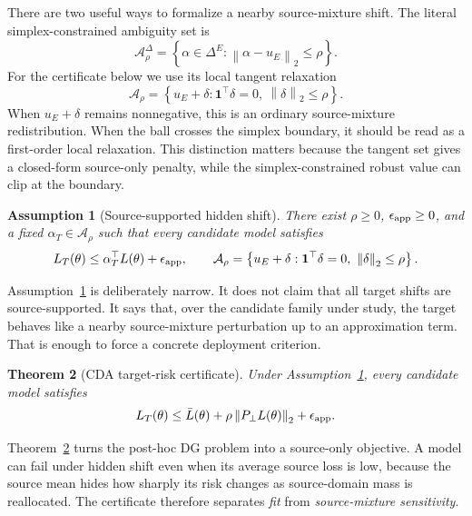 \documentclass{article}
\newtheorem{theorem}{Theorem}[section]
\newtheorem{assumption}[theorem]{Assumption}
\theoremstyle{definition}
\newcommand{\cA}{\mathcal{A}}
\newcommand{\simplex}{\Delta}
\newcommand{\one}{\mathbf{1}}
\newcommand{\norm}[1]{\left\lVert #1 \right\rVert}
\newcommand{\braces}[1]{\left\{ #1 \right\}}
\newcommand{\ub}{u_E}
\begin{document}
There are two useful ways to formalize a nearby source-mixture shift. The literal simplex-constrained ambiguity set is
\[
\cA_\rho^\Delta
=
\braces{\alpha\in\simplex^E:\norm{\alpha-\ub}_2\le\rho}.
\]
For the certificate below we use its local tangent relaxation
\[
\cA_\rho
=
\braces{\ub+\delta:\one^\top\delta=0,\ \norm{\delta}_2\le\rho}.
\]
When \(\ub+\delta\) remains nonnegative, this is an ordinary source-mixture redistribution. When the ball crosses the simplex boundary, it should be read as a first-order local relaxation. This distinction matters because the tangent set gives a closed-form source-only penalty, while the simplex-constrained robust value can clip at the boundary.

\begin{assumption}[Source-supported hidden shift]
\label{ass:hidden_shift}
There exist \(\rho \ge 0\), \(\epsilon_{\rm app} \ge 0\), and a fixed \(\alpha_T \in \cA_\rho\) such that every candidate model satisfies
\begin{equation}
L_T(\theta) \le \alpha_T^\top L(\theta) + \epsilon_{\rm app},
\qquad
\cA_\rho = \braces{\ub + \delta : \one^\top \delta = 0,\ \norm{\delta}_2 \le \rho }.
\label{eq:hidden_shift}
\end{equation}
\end{assumption}

Assumption~\ref{ass:hidden_shift} is deliberately narrow. It does not claim that all target shifts are source-supported. It says that, over the candidate family under study, the target behaves like a nearby source-mixture perturbation up to an approximation term. That is enough to force a concrete deployment criterion.

\begin{theorem}[CDA target-risk certificate]
\label{thm:cda_certificate}
Under Assumption~\ref{ass:hidden_shift}, every candidate model satisfies
\begin{equation}
L_T(\theta)
\le
\bar L(\theta) + \rho \norm{P_\perp L(\theta)}_2 + \epsilon_{\rm app}.
\label{eq:cda_certificate}
\end{equation}
\end{theorem}

Theorem~\ref{thm:cda_certificate} turns the post-hoc DG problem into a source-only objective. A model can fail under hidden shift even when its average source loss is low, because the source mean hides how sharply its risk changes as source-domain mass is reallocated. The certificate therefore separates \emph{fit} from \emph{source-mixture sensitivity}.
\end{document}
